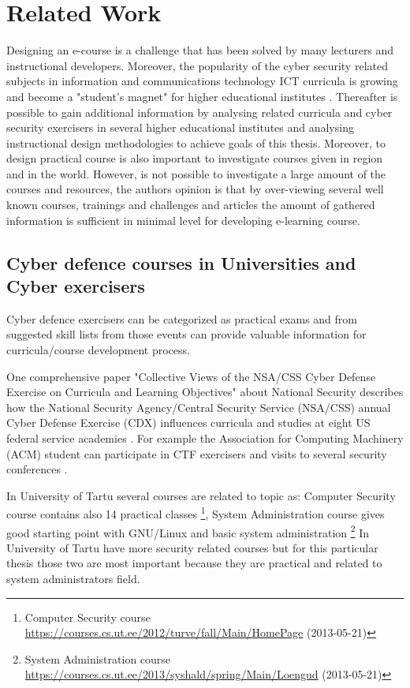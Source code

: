 \section{Related Work}
\label{Related Work}
Designing an e-course is a challenge that has been solved by many lecturers and instructional developers. Moreover, the popularity of the cyber security related subjects in information and communications technology ICT curricula is growing and become a "student’s magnet" for higher educational institutes \citep{CyberIsHot}. Thereafter is possible to gain additional information by analysing related curricula and cyber security exercisers  in several higher educational institutes and analysing instructional design methodologies to achieve goals of this thesis. Moreover, to design practical course is also important to investigate courses given in region and in the world. However, is not possible to investigate a large amount of the courses and resources, the authors opinion is that by over-viewing several well known courses, trainings and challenges and articles the amount of gathered information is sufficient in minimal level for developing e-learning course.

\subsection{Cyber defence courses in Universities and Cyber exercisers}
Cyber defence exercisers can be categorized as practical exams and from suggested skill lists from those events can provide valuable information for curricula/course development process.

One comprehensive paper "Collective Views of the NSA/CSS Cyber Defense Exercise
on Curricula and Learning Objectives" about National Security describes how the National Security
Agency/Central Security Service (NSA/CSS) annual Cyber Defense Exercise (\gls{CDX}) influences curricula and studies at eight US federal service academies \citep{adams_CDX_curricula}. For example the Association for Computing Machinery (ACM) student can participate in \gls{CTF} exercisers and  visits to several security conferences \citep{adams_CDX_curricula}.

In University of Tartu several courses are related to topic as: Computer Security course  contains also 14 practical classes \footnote{Computer Security course   \url{https://courses.cs.ut.ee/2012/turve/fall/Main/HomePage} (2013-05-21)}, System Administration course gives good starting point with GNU/Linux and basic system administration \footnote{ System Administration course  \url{https://courses.cs.ut.ee/2013/syshald/spring/Main/Loengud} (2013-05-21)}
In University of Tartu have more security related courses but for this particular thesis those two are most important because they are practical and related to system administrators field.


